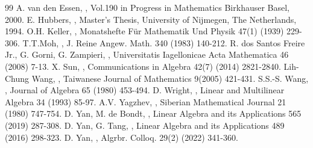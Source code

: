 \documentclass[12pt, twoside, leqno]{article}
\theoremstyle{definition}
\numberwithin{equation}{section}
\begin{document}
\begin{thebibliography}{99}
 A. van den Essen, , Vol.\@ 190 in Progress in Mathematics Birkhauser Basel, 2000.
 E. Hubbers, , Master's Thesis, University of Nijmegen, The Netherlands, 1994.
 O.H. Keller, , Monatshefte F\"{u}r Mathematik Und Physik 47(1) (1939) 229-306.
 T.T.Moh, , J. Reine Angew. Math. 340 (1983) 140-212.
 R. dos Santos Freire Jr., G. Gorni, G. Zampieri, , Universitatis Iagellonicae Acta Mathematica 46 (2008) 7-13.
 X. Sun, , Communications in Algebra 42(7) (2014) 2821-2840.
 Lih-Chung Wang, , Taiwanese Journal of Mathematics 9(2005) 421-431.
 S.S.-S. Wang, , Journal of Algebra 65 (1980) 453-494.
 D. Wright, , Linear and Multilinear Algebra 34 (1993) 85-97.
 A.V. Yagzhev, , Siberian Mathematical Journal 21 (1980) 747-754.
 D. Yan, M. de Bondt, , Linear Algebra and its Applications 565 (2019) 287-308.
 D. Yan, G. Tang, , Linear Algebra and its Applications 489 (2016) 298-323.
 D. Yan, , Algrbr. Colloq. 29(2) (2022) 341-360.
\end{thebibliography}
\end{document}
